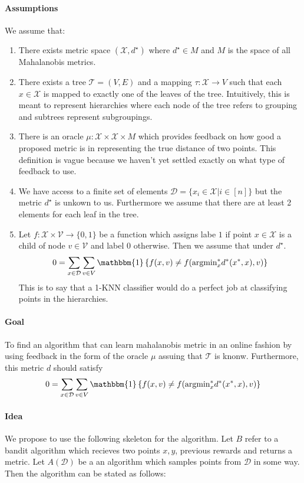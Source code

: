 \documentclass{article}
\begin{document}
\paragraph{Assumptions} We assume that:
\begin{enumerate}
\item
  There exists metric space $(\mathcal{X}, d^\star)$ where $d^\star \in M$ and $M$ is the space of all Mahalanobis metrics.
\item
  There exists a tree $\mathcal{T} = (V, E)$ and a mapping $\tau: \mathcal{X} \to V$ such that each $x \in \mathcal{X}$ is mapped to exactly one of the leaves of the tree. 
  Intuitively, this is meant to represent hierarchies where each node of the tree refers to grouping and subtrees represent subgroupings.
\item
  There is an oracle $\mu:\mathcal{X} \times \mathcal{X} \times M$ which provides feedback on how good a proposed metric is in representing the true distance of two points.
  This definition is vague because we haven't yet settled exactly on what type of feedback to use.
\item 
  We have access to a finite set of elements $\mathcal{D} = \{x_i \in \mathcal{X}| i \in [n] \}$ but the metric $d^\star$ is unkown to us. 
  Furthermore we assume that there are at least 2 elements for each leaf in the tree. 
\item
  Let $f: \mathcal{X} \times \mathcal{V} \to \{0,1\}$ be a function which assigns labe $1$ if point $x \in \mathcal{X}$ is a child of node $v \in \mathcal{V}$ and label $0$ otherwise.
  Then we assume that under $d^\star$. 
  \[0 = \sum_{x \in \mathcal{D}} \sum_{v \in V} \mathbbm{1}\left\{f(x,v) \neq f(\text{argmin}_x^* d^*(x^*,x),v)\right\} \] 
  This is to say that a 1-KNN classifier would do a perfect job at classifying points in the hierarchies. 
\end{enumerate}
\paragraph{Goal}
  To find an algorithm that can learn mahalanobis metric in an online fashion by using feedback in the form of the oracle $\mu$ assuing that $\mathcal{T}$ is knonw. 
  Furthermore, this metric $d$ should satisfy 
  \[0 = \sum_{x \in \mathcal{D}} \sum_{v \in V} \mathbbm{1}\left\{f(x,v) \neq f(\text{argmin}_x^* d^*(x^*,x),v)\right\} \] 
\paragraph{Idea}  
We propose to use the following skeleton for the algorithm. Let $B$ refer to a bandit algorithm which recieves two points $x,y$, previous rewards and returns a metric. Let 
$A(\mathcal{D})$ be a an algorithm which samples points from $\mathcal{D}$ in some way. 
Then the algorithm can be stated as follows:
\end{document}

